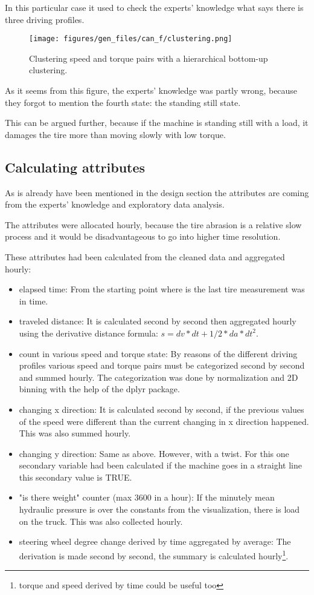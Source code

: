 	In this particular case it used to check the experts' knowledge what says there is three driving profiles.
	\begin{figure}[H]
			\centering
			\texttt{[image: figures/gen\_files/can\_f/clustering.png]}
			\caption{Clustering speed and torque pairs with a hierarchical bottom-up clustering.} 
	\end{figure}
	As it seems from this figure, the experts' knowledge was partly wrong, because they forgot to mention the fourth state: the standing still state.

	This can be argued further, because if the machine is standing still with a load, it damages the tire more than moving slowly with low torque.
\newpage
\subsection{Calculating attributes}
As is already have been mentioned in the design section the attributes are coming from the experts' knowledge and exploratory data analysis.

The attributes were allocated hourly, because the tire abrasion is a relative slow process and it would be disadvantageous to go into higher time resolution.

These attributes had been calculated from the cleaned data and aggregated hourly:
	\begin{itemize}
		\item{elapsed time:} From the starting point where is the last tire measurement was in time.
		\item{traveled distance:} It is calculated second by second then aggregated hourly using the derivative distance formula: $s = dv*dt + 1/2*da*dt^2$.
		\item{count in various speed and torque state:} By reasons of the different driving profiles various speed and torque pairs must be categorized second by second and summed hourly. The categorization was done by normalization and 2D binning with the help of the dplyr package.
		\item{changing x direction:} It is calculated second by second, if the previous values of the speed were different than the current changing in x direction happened. This was also summed hourly.
		\item{changing y direction:} Same as above. However, with a twist. For this one secondary variable had been calculated if the machine goes in a straight line this secondary value is TRUE.
		\item{"is there weight" counter (max 3600 in a hour):} If the minutely mean hydraulic pressure is over the constants from the visualization, there is load on the truck. This was also collected hourly.
		\item{steering wheel degree change derived by time aggregated by average:} The derivation is made second by second, the summary is calculated hourly\footnote{torque and speed derived by time could be useful too}.
	\end{itemize}
